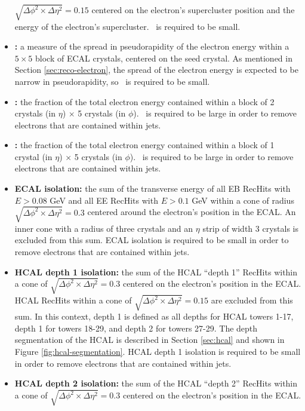 \begin{itemize}
    $\sqrt{\Delta\phi^2\times\Delta\eta^2} = 0.15$ centered on the electron's supercluster position
    and the energy of the electron's supercluster.  \HoE~is required to be small.
  \item {\bf \SigmaiEtaiEta:} a measure of the spread in pseudorapidity of the electron energy
    within a $5\times5$ block of ECAL crystals, centered on the seed crystal.  As mentioned
    in Section \ref{sec:reco-electron}, the spread of the electron energy 
    is expected to be narrow in pseudorapidity, so \SigmaiEtaiEta~is required to be small.
  \item {\bf \ETwoEFive:} the fraction of the total electron energy contained within a block 
    of 2 crystals (in $\eta$) $\times$ 5 crystals (in $\phi$).  \ETwoEFive~is required to be large 
    in order to remove electrons that are contained within jets.
  \item {\bf \EOneEFive:} the fraction of the total electron energy contained within a block 
    of 1 crystal (in $\eta$) $\times$ 5 crystals (in $\phi$).  \EOneEFive~is required to be large 
    in order to remove electrons that are contained within jets.
  \item {\bf ECAL isolation: } the sum of the transverse energy of all EB RecHits with 
    $E > 0.08$ GeV and all EE RecHits with $E > 0.1$ GeV within a cone of radius 
    $\sqrt{\Delta\phi^2\times\Delta\eta^2} = 0.3$ centered around the electron's position in the ECAL.
    An inner cone with a radius of three crystals and an $\eta$ strip of width 3 crystals is excluded from
    this sum.  ECAL isolation is required to be small in order to remove electrons that are contained
    within jets.
  \item {\bf HCAL depth 1 isolation:} the sum of the HCAL ``depth 1'' RecHits within a cone 
    of $\sqrt{\Delta\phi^2\times\Delta\eta^2} = 0.3$ centered on the electron's position in the ECAL.
    HCAL RecHits within a cone of $\sqrt{\Delta\phi^2\times\Delta\eta^2} = 0.15$ are excluded from this
    sum.  In this context, depth 1 is defined as all depths for HCAL towers 1-17, depth 1 for towers 
    18-29, and depth 2 for towers 27-29.  The depth segmentation of the HCAL is described in Section
    \ref{sec:hcal} and shown in Figure \ref{fig:hcal-segmentation}.  HCAL depth 1 isolation is 
    required to be small in order to remove electrons that are contained
    within jets.
  \item {\bf HCAL depth 2 isolation:} the sum of the HCAL ``depth 2'' RecHits within a cone 
    of $\sqrt{\Delta\phi^2\times\Delta\eta^2} = 0.3$ centered on the electron's position in the ECAL.

\end{itemize}
